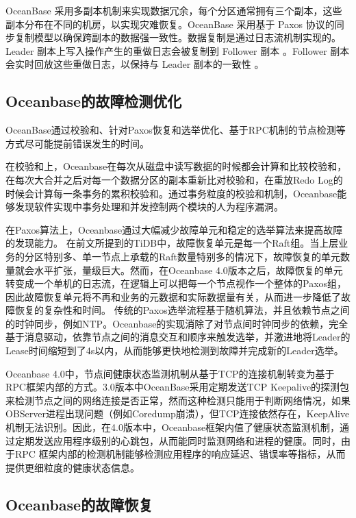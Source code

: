 OceanBase 采用多副本机制来实现数据冗余，每个分区通常拥有三个副本，这些副本分布在不同的机房，以实现灾难恢复。OceanBase 采用基于 Paxos 协议的同步复制模型以确保跨副本的数据强一致性。数据复制是通过日志流机制实现的。Leader 副本上写入操作产生的重做日志会被复制到 Follower 副本 。Follower 副本会实时回放这些重做日志，以保持与 Leader 副本的一致性 。


\subsection{Oceanbase的故障检测优化}

OceanBase通过校验和、针对Paxos恢复和选举优化、基于RPC机制的节点检测等方式尽可能提前错误发生的时间。

在校验和上，Oceanbase在每次从磁盘中读写数据的时候都会计算和比较校验和，在每次大合并之后对每一个数据分区的副本重新比对校验和，在重放Redo Log的时候会计算每一条事务的累积校验和。通过事务粒度的校验和机制，Oceanbase能够发现软件实现中事务处理和并发控制两个模块的人为程序漏洞。

在Paxos算法上，Oceanbase通过大幅减少故障单元和稳定的选举算法来提高故障的发现能力。
在前文所提到的TiDB中，故障恢复单元是每一个Raft组。当上层业务的分区特别多、单一节点上承载的Raft数量特别多的情况下，故障恢复的单元数量就会水平扩张，量级巨大。然而，在Oceanbase 4.0版本之后，故障恢复的单元转变成一个单机的日志流，在逻辑上可以把每一个节点视作一个整体的Paxos组，因此故障恢复单元将不再和业务的元数据和实际数据量有关，从而进一步降低了故障恢复的复杂性和时间。
传统的Paxos选举流程基于随机算法，并且依赖节点之间的时钟同步，例如NTP。Oceanbase的实现消除了对节点间时钟同步的依赖，完全基于消息驱动，依靠节点之间的消息交互和顺序来触发选举，并激进地将Leader的Lease时间缩短到了4s以内，从而能够更快地检测到故障并完成新的Leader选举。

Oceanbase 4.0中，节点间健康状态监测机制从基于TCP的连接机制转变为基于RPC框架内部的方式。3.0版本中OceanBase采用定期发送TCP Keepalive的探测包来检测节点之间的网络连接是否正常，然而这种检测只能用于判断网络情况，如果OBServer进程出现问题（例如Coredump崩溃），但TCP连接依然存在，KeepAlive机制无法识别。因此，在4.0版本中，Oceanbase框架内值了健康状态监测机制，通过定期发送应用程序级别的心跳包，从而能同时监测网络和进程的健康。同时，由于RPC 框架内部的检测机制能够检测应用程序的响应延迟、错误率等指标，从而提供更细粒度的健康状态信息。

\subsection{Oceanbase的故障恢复}

